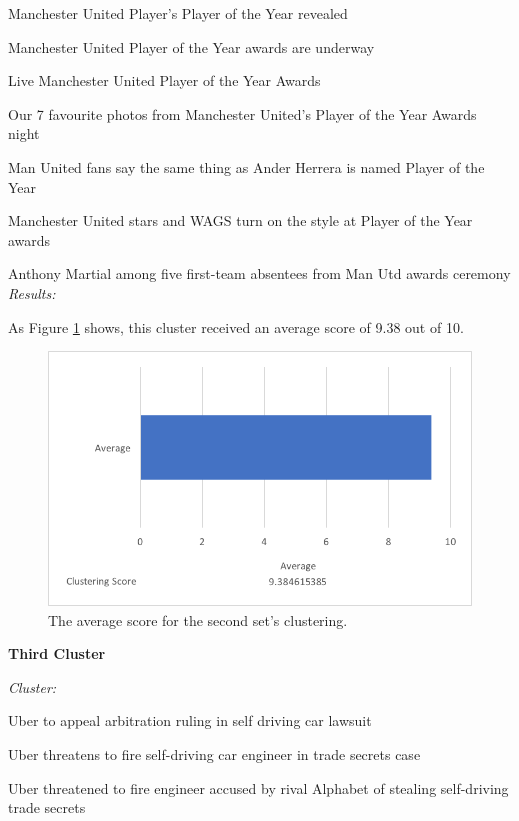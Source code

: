 \documentclass[12pt]{article}
\begin{document}
Manchester United Player's Player of the Year revealed

Manchester United Player of the Year awards are underway

Live Manchester United Player of the Year Awards

Our 7 favourite photos from Manchester United's Player of the Year Awards night

Man United fans say the same thing as Ander Herrera is named Player of the Year

Manchester United stars and WAGS turn on the style at Player of the Year awards

Anthony Martial among five first-team absentees from Man Utd awards ceremony \\

\emph{Results:}

As Figure \ref{cluster2} shows, this cluster received an average score of 9.38 out of 10. \\

\begin{figure}[ht!]
  \centering
    \includegraphics[scale=0.7]{cluster2score.png}
   \caption[The average score for a cluster]{The average score for the second set's clustering.} 
   \label{cluster2}
\end{figure} 

\textbf{Third Cluster}

\emph{Cluster:}

Uber to appeal arbitration ruling in self driving car lawsuit

Uber threatens to fire self-driving car engineer in trade secrets case

Uber threatened to fire engineer accused by rival Alphabet of stealing self-driving trade secrets
\end{document}
